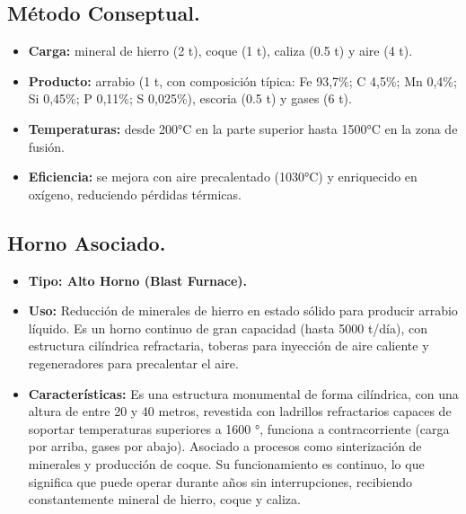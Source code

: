\documentclass[12pt,a4paper]{article}
\begin{document}
\subsection{Método Conseptual.}

\begin{itemize}
    \item \textbf{Carga:} mineral de hierro (2 t), coque (1 t), caliza (0.5 t) y aire (4 t).
    \item \textbf{Producto:} arrabio (1 t, con composición típica: Fe 93,7\%; C 4,5\%; Mn 0,4\%; Si 0,45\%; P 0,11\%; S 0,025\%), escoria (0.5 t) y gases (6 t).
    \item \textbf{Temperaturas:} desde 200°C en la parte superior hasta 1500°C en la zona de fusión.
    \item \textbf{Eficiencia:} se mejora con aire precalentado (1030°C) y enriquecido en oxígeno, reduciendo pérdidas térmicas.
\end{itemize}

\subsection{Horno Asociado.}

\begin{itemize}
    \item \textbf{Tipo: Alto Horno (Blast Furnace).}
    \item \textbf{Uso:} Reducción de minerales de hierro en estado sólido para producir arrabio líquido. Es un horno continuo de gran capacidad (hasta 5000 t/día), con estructura cilíndrica refractaria, toberas para inyección de aire caliente y regeneradores para precalentar el aire.
    \item \textbf{Características:} Es una estructura monumental de forma cilíndrica, con una altura de entre 20 y 40 metros, revestida con ladrillos refractarios capaces de soportar temperaturas superiores a 1600 °, funciona a contracorriente (carga por arriba, gases por abajo). Asociado a procesos como sinterización de minerales y producción de coque. Su funcionamiento es continuo, lo que significa que puede operar durante años sin interrupciones, recibiendo constantemente mineral de hierro, coque y caliza.
\end{itemize}
\end{document}
